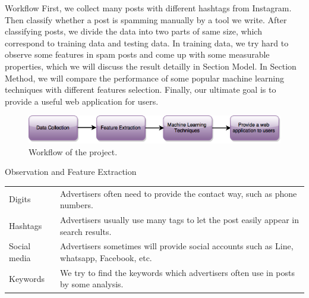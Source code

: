 \documentclass[final,hyperref={pdfpagelabels=false}]{beamer}
\begin{document}
\begin{frame}[t]
\begin{columns}[t]
\begin{column}{.465\textwidth}
\begin{block}{Workflow}
First, we collect many posts with different hashtags from Instagram. Then classify whether a post is spamming manually by a tool we write. After classifying posts, we divide the data into two parts of same size, which correspond to training data and testing data. In training data, we try hard to observe some features in spam posts and come up with some measurable properties, which we will discuss the result detailly in Section Model. In Section Method, we will compare the performance of some popular machine learning techniques with different features selection. Finally, our ultimate goal is to provide a useful web application for users. 

\centering
\begin{figure}
\includegraphics[scale=1]{workflow.png}
\caption{Workflow of the project.}
\end{figure}


\end{block}


\begin{block}{Observation and Feature Extraction}



\begin{tabular}{ll}
Digits & Advertisers often need to provide the contact way, such as phone numbers. \\
Hashtags & Advertisers usually use many tags to let the post easily appear in search results. \\
Social media & Advertisers sometimes will provide social accounts such as Line, whatsapp, Facebook, etc. \\
Keywords & We try to find the keywords which advertisers often use in posts by some analysis.

\end{tabular}

\end{block}



\end{column}
\end{columns}
\end{frame}
\end{document}

